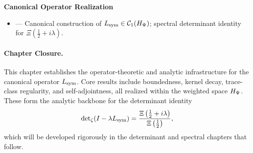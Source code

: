 \textbf{Canonical Operator Realization}
\begin{itemize}
  \item {} — Canonical construction of \( L_{\mathrm{sym}} \in \mathcal{C}_1(H_{\Psi}) \); spectral determinant identity for \( \Xi(\tfrac{1}{2} + i\lambda) \).
\end{itemize}

\paragraph{Chapter Closure.}
This chapter establishes the operator-theoretic and analytic infrastructure for the canonical operator \( L_{\mathrm{sym}} \). Core results include boundedness, kernel decay, trace-class regularity, and self-adjointness, all realized within the weighted space \( H_{\Psi} \). These form the analytic backbone for the determinant identity
\[
\det\nolimits_{\zeta}(I - \lambda L_{\mathrm{sym}})
= \frac{\Xi\left(\tfrac{1}{2} + i\lambda \right)}{\Xi\left(\tfrac{1}{2} \right)},
\]
which will be developed rigorously in the determinant and spectral chapters that follow.
